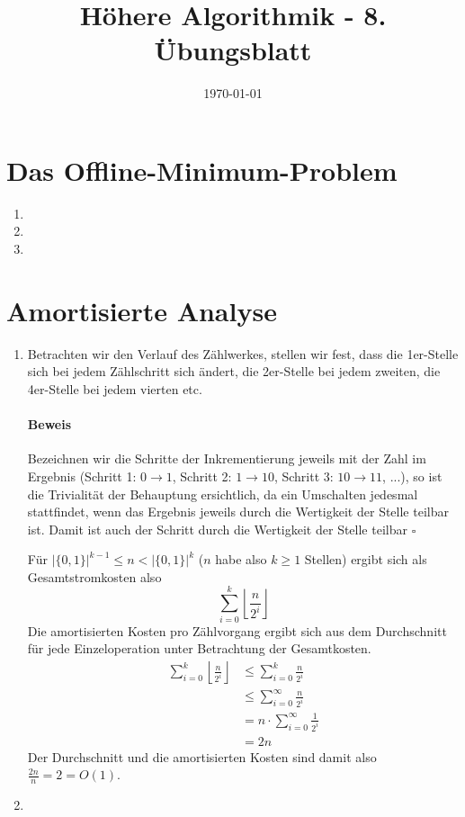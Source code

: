 \documentclass[a4paper,10pt]{article}
\title{H\"ohere Algorithmik - 8. \"Ubungsblatt}
\author{\Authors}
\date{\today}
\begin{document}
\maketitle

\section{Das Offline-Minimum-Problem}
\begin{enumerate}
\item   
\item   
\item   
\end{enumerate}

\section{Amortisierte Analyse}
\begin{enumerate}
\item   Betrachten wir den Verlauf des Zählwerkes, stellen wir fest, dass die 1er-Stelle sich bei jedem Zählschritt sich 
        ändert, die 2er-Stelle bei jedem zweiten, die 4er-Stelle bei jedem vierten etc. 
        \paragraph*{Beweis} Bezeichnen wir die Schritte der Inkrementierung jeweils mit der Zahl im Ergebnis (Schritt 1: $0 \to 1$, Schritt 2: $1 \to 10$, Schritt 3: $10 \to 11$, ...), so ist die Trivialität der Behauptung ersichtlich, da ein Umschalten jedesmal stattfindet, wenn das Ergebnis jeweils durch die Wertigkeit der Stelle teilbar ist. Damit ist auch der Schritt durch die Wertigkeit der Stelle teilbar \hfill $\square$
        
        Für $\left|\{0,1\}\right|^{k-1} \leq n < \left|\{0,1\}\right|^{k}$ ($n$ habe also $k \geq 1$ Stellen) ergibt sich als Gesamtstromkosten also
        \[\sum\limits_{i=0}^{k} \left\lfloor\frac{n}{2^i}\right\rfloor\]
        Die amortisierten Kosten pro Zählvorgang ergibt sich aus dem Durchschnitt für jede Einzeloperation unter Betrachtung der Gesamtkosten.
        \begin{align*}
         \sum\limits_{i=0}^{k} \left\lfloor\frac{n}{2^i}\right\rfloor &\leq \sum\limits_{i=0}^{k} \frac{n}{2^i} \\
                                                                      &\leq \sum\limits_{i=0}^{\infty} \frac{n}{2^i} \\
                                                                      &= n \cdot \sum\limits_{i=0}^{\infty} \frac{1}{2^i} \\
                                                                      &= 2n
        \end{align*}
        Der Durchschnitt und die amortisierten Kosten sind damit also $\frac{2n}{n} = 2 = O(1)$.
\item   
\end{enumerate}
\end{document}
